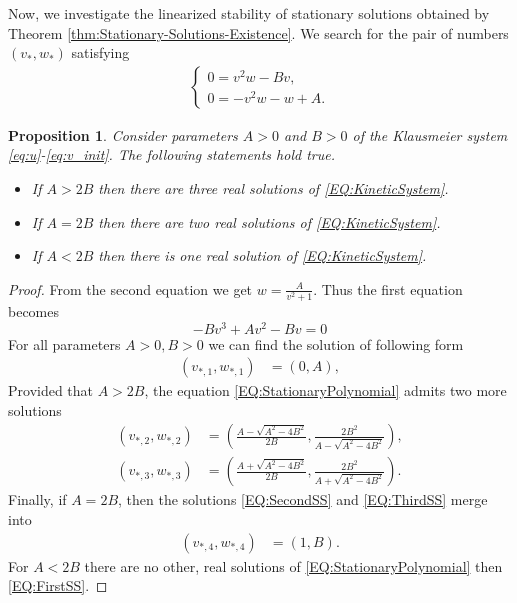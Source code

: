 \documentclass[11pt, a4paper]{article}
\theoremstyle{break}
\theoremstyle{break}
\newtheorem{prp}{Proposition}[section]
\theoremstyle{break}
\theoremstyle{break}
\theoremstyle{break}
\theoremstyle{break}
\theoremstyle{break}
\begin{document}
Now, we investigate the linearized stability of stationary solutions obtained by Theorem \ref{thm:Stationary-Solutions-Existence}. We search for the pair of numbers $(v_*, w_*)$ satisfying
\begin{align}
    \label{EQ:KineticSystem}
    \begin{cases}
        0 = v^2w - Bv,\\
        0 = -v^2w - w + A.
    \end{cases}
\end{align}
\begin{prp}
    \label{prp:ExistenceOfConstantSSKineticSystem}
    Consider parameters $A > 0$ and $B > 0$ of the Klausmeier system \eqref{eq:u}-\eqref{eq:v_init}. The following statements hold true.
    \begin{itemize}
        \item If $A > 2B$ then there are three real solutions of \eqref{EQ:KineticSystem}.
        \item If $A = 2B$ then there are two real solutions of \eqref{EQ:KineticSystem}.
        \item If $A < 2B$ then there is one real solution of \eqref{EQ:KineticSystem}.
    \end{itemize}
\end{prp}

\begin{proof}
    From the second equation we get $w = \frac{A}{v^2 + 1}$. Thus the first equation becomes
    \begin{equation}
        \label{EQ:StationaryPolynomial}
        -B v^3 + A v^2 - B v = 0
    \end{equation}
    For all parameters $A > 0, B > 0$ we can find the solution of following form
    \begin{align}
        \label{EQ:FirstSS}
        \left(v_{*,1}, w_{*,1}\right) &= \left(0, A\right),
    \end{align}
    Provided that $A > 2B$, the equation \eqref{EQ:StationaryPolynomial} admits two more solutions
    \begin{align}
        \left(v_{*,2}, w_{*,2}\right) &= \left(\frac{A - \sqrt{A^2 - 4B^2}}{2B}, \frac{2 B^2}{A - \sqrt{A^2 - 4B^2}}\right), \label{EQ:SecondSS}\\
        \left(v_{*,3}, w_{*,3}\right) &= \left(\frac{A + \sqrt{A^2 - 4B^2}}{2B}, \frac{2 B^2}{A + \sqrt{A^2 - 4B^2}}\right) \label{EQ:ThirdSS}.
    \end{align}
    Finally, if $A = 2B$, then the solutions \eqref{EQ:SecondSS} and \eqref{EQ:ThirdSS} merge into 
    \begin{align}
        \label{EQ:FourthSS}
        \left( v_{*,4}, w_{*,4} \right) &= \left(1, B\right).
    \end{align}
    For $A < 2B$ there are no other, real solutions of \eqref{EQ:StationaryPolynomial} then \eqref{EQ:FirstSS}.
\end{proof}
\end{document}
